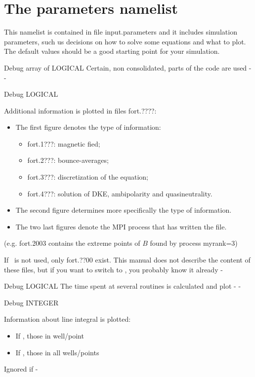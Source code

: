 {%

\section{The {\ttfamily parameters} namelist}\label{SEC_PARAM}

This namelist is contained in file {\ttfamily input.parameters} and it includes simulation parameters, such us decisions on how to solve some equations and what to plot. The default values should be a good starting point for your simulation.

{Debug}
{array of LOGICAL}
{Certain, non consolidated, parts of the code are used}
{\false}
{-}
{-}

{Debug}
{LOGICAL}
{Additional information is plotted in files {\ttfamily fort.????}:\begin{itemize}
\item The first figure denotes the type of information:\begin{itemize}
\item {\ttfamily fort.1???}: magnetic fied;
\item {\ttfamily fort.2???}: bounce-averages;
\item {\ttfamily fort.3???}: discretization of the equation;
\item {\ttfamily fort.4???}: solution of DKE, ambipolarity and quasineutrality.\end{itemize}
\item The second figure determines more specifically the type of information.
\item The two last figures denote the {\ttfamily MPI} process that has written the file.
\end{itemize}
(e.g. {\ttfamily fort.2003} contains the extreme points of $B$ found by process {\ttfamily myrank=3})}
{\false}
{If \MPI~is not used, only {\ttfamily fort.??00} exist. This manual does not describe the content of these files, but if you want to switch  to \true, you probably know it already}
{-}

{Debug}
{LOGICAL}
{The time spent at several routines is calculated and plot}
{\true}
{-}
{-}

{Debug}
{INTEGER}
{Information about line integral is plotted:\begin{itemize}
\item If , those in well/point 
\item If , those in all wells/points
\end{itemize}}
{\false}
{Ignored if \notf{}}
{-}

}
